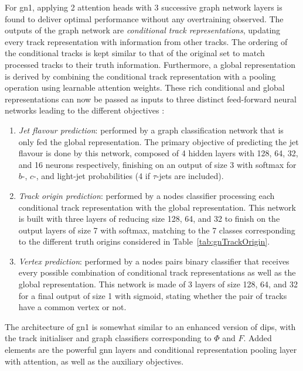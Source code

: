 For \gls{gn1}, applying 2 attention heads with 3 successive graph network layers is found to deliver optimal performance without any overtraining observed. The outputs of the graph network are \textit{conditional track representations}, updating every track representation with information from other tracks. The ordering of the conditional tracks is kept similar to that of the original set to match processed tracks to their truth information. Furthermore, a global representation is derived by combining the conditional track representation with a pooling operation using learnable attention weights. These rich conditional and global representations can now be passed as inputs to three distinct feed-forward neural networks leading to the different objectives \cite{ATL-PHYS-PUB-2022-027}:
\begin{enumerate}
  \item \textit{Jet flavour prediction}: performed by a graph classification network that is only fed the global representation. The primary objective of predicting the jet flavour is done by this network, composed of 4 hidden layers with 128, 64, 32, and 16 neurons respectively, finishing on an output of size 3 with softmax for $b$-, $c$-, and light-jet probabilities (4 if $\tau$-jets are included).
  \item \textit{Track origin prediction}: performed by a nodes classifier processing each conditional track representation with the global representation. This network is built with three layers of reducing size 128, 64, and 32 to finish on the output layers of size 7 with softmax, matching to the 7 classes corresponding to the different truth origins considered in Table~\ref{tab:gnTrackOrigin}.
  \item \textit{Vertex prediction}: performed by a nodes pairs binary classifier that receives every possible combination of conditional track representations as well as the global representation. This network is made of 3 layers of size 128, 64, and 32 for a final output of size 1 with sigmoid, stating whether the pair of tracks have a common vertex or not. 
\end{enumerate}

The architecture of \gls{gn1} is somewhat similar to an enhanced version of \gls{dips}, with the track initialiser and graph classifiers corresponding to $\Phi$ and $F$. Added elements are the powerful \gls{gnn} layers and conditional representation pooling layer with attention, as well as the auxiliary objectives. \\

